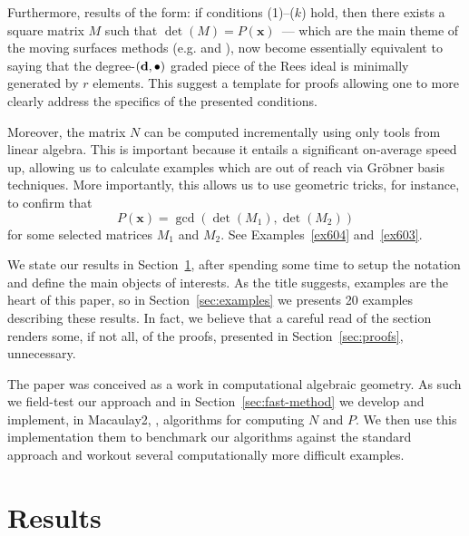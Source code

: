 \documentclass[fleqn,reqno]{amsart}
\begin{document}
\begin{paragraf*}
Furthermore, results of the form:
if conditions (1)--($k$) hold,
then there exists a square matrix $M$ such that $\det(M)=P(\mathbf x)$~---
which are the main theme of the moving surfaces methods
(e.g. \citet{BCD-03} and \citet{AHW-05}),
now become essentially equivalent to saying that the degree-$(\mathbf d,\bullet)$ graded piece
of the Rees ideal is minimally generated by $r$ elements.
This suggest a template for proofs allowing one to more clearly
address the specifics of the presented conditions.

Moreover, the matrix $N$ can be computed incrementally
using only tools from linear algebra.
This is important because it entails a significant on-average speed up,
allowing us to calculate examples which are out of reach via Gr\"obner basis techniques.
More importantly, this allows us to use geometric tricks, for instance,
to confirm that
\[
	P(\mathbf x)=\gcd(\det(M_1),\det(M_2))
\]
for some selected matrices $M_1$ and $M_2$.
See Examples~\ref{ex604} and~\ref{ex603}.
\end{paragraf*}

\begin{paragraf*}
We state our results in Section~\ref{sec:results},
after spending some time to setup the notation and
define the main objects of interests.
As the title suggests, examples are the heart of this paper,
so in Section~\ref{sec:examples} we presents 20 examples describing these results.
In fact, we believe that a careful read of the section renders some, if not all,
of the proofs, presented in Section~\ref{sec:proofs}, unnecessary.

The paper was conceived as a work in computational algebraic geometry.
As such we field-test our approach and in Section~\ref{sec:fast-method}
we develop and implement, in Macaulay2, \citet{M2},
algorithms for computing $N$ and $P$.
We then use this implementation them to benchmark our algorithms against the standard approach
and workout several computationally more difficult examples.
\end{paragraf*}

\begin{paragraf*}
\end{paragraf*}





\section{Results}
\label{sec:results}
\end{document}
